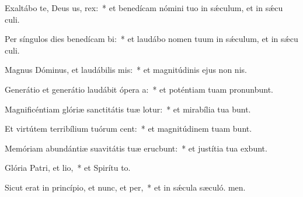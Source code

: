 \item Exaltábo te, Deus us, rex:~* et benedícam nómini tuo in sǽculum, et in sǽcu culi.
\item Per síngulos dies benedícam bi:~* et laudábo nomen tuum in sǽculum, et in sǽcu culi.
\item Magnus Dóminus, et laudábilis mis:~* et magnitúdinis ejus non  nis.
\item Generátio et generátio laudábit ópera a:~* et poténtiam tuam pronunbunt.
\item Magnificéntiam glóriæ sanctitátis tuæ lotur:~* et mirabília tua bunt.
\item Et virtútem terribílium tuórum cent:~* et magnitúdinem tuam bunt.
\item Memóriam abundántiæ suavitátis tuæ erucbunt:~* et justítia tua exbunt.
\item Glória Patri, et lio,~* et Spirítu to.
\item Sicut erat in princípio, et nunc, et per,~* et in sǽcula sæculó. men.
